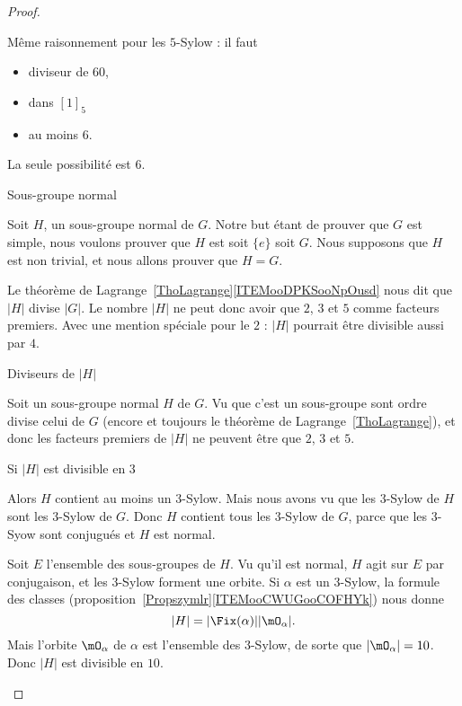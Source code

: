 \begin{proof}
\begin{subproof}
                Même raisonnement pour les \( 5\)-Sylow : il faut
                \begin{itemize}
                    \item diviseur de \( 60\),
                    \item dans \( [1]_5\)
                    \item au moins \( 6\).
                \end{itemize}
                La seule possibilité est \( 6\).

            \item[Sous-groupe normal]

                Soit \( H\), un sous-groupe normal de \( G\). Notre but étant de prouver que \( G\) est simple, nous voulons prouver que \( H\) est soit \( \{ e \}\) soit \( G\). Nous supposons que \( H\) est non trivial, et nous allons prouver que \( H=G\).

                Le théorème de Lagrange~\ref{ThoLagrange}\ref{ITEMooDPKSooNpOusd} nous dit que \( | H |\) divise \( | G |\). Le nombre \( | H |\) ne peut donc avoir que \( 2\), \( 3\) et \( 5\) comme facteurs premiers. Avec une mention spéciale pour le \( 2\) : \( | H |\) pourrait être divisible aussi par \( 4\).

            \item[Diviseurs de \( | H |\)]

                Soit un sous-groupe normal \( H\) de \( G\). Vu que c'est un sous-groupe sont ordre divise celui de \( G\) (encore et toujours le théorème de Lagrange~\ref{ThoLagrange}), et donc les facteurs premiers de \( | H |\) ne peuvent être que \( 2\), \( 3\) et \( 5\).

            \item[Si \( | H |\) est divisible en \( 3\)]

                Alors \( H\) contient au moins un \( 3\)-Sylow. Mais nous avons vu que les \( 3\)-Sylow de \( H\) sont les \( 3\)-Sylow de \( G\). Donc \( H\) contient tous les \( 3\)-Sylow de \( G\), parce que les \( 3\)-Syow sont conjugués et \( H\) est normal.

                Soit \( E\) l'ensemble des sous-groupes de \( H\). Vu qu'il est normal, \( H\) agit sur \( E\) par conjugaison, et les \( 3\)-Sylow forment une orbite. Si \( \alpha\) est un \( 3\)-Sylow, la formule des classes (proposition~\ref{Propszymlr}\ref{ITEMooCWUGooCOFHYk}) nous donne
                \begin{equation}
                    | H |=| \Fix(\alpha) | |\mO_{\alpha} |.
                \end{equation}
                Mais l'orbite \( \mO_{\alpha}\) de \( \alpha\) est l'ensemble des \( 3\)-Sylow, de sorte que \( | \mO_{\alpha} |=10\). Donc \( | H |\) est divisible en \( 10\).


\end{subproof}
\end{proof}
